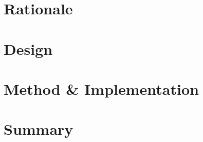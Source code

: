 \label{sec:rebuilding:introduction}



\section{Rationale}
\label{sec:rebuilding:rationale}



\section{Design}
\label{sec:rebuilding:design}



\section{Method \& Implementation}
\label{sec:rebuilding:method}



\section{Summary}


